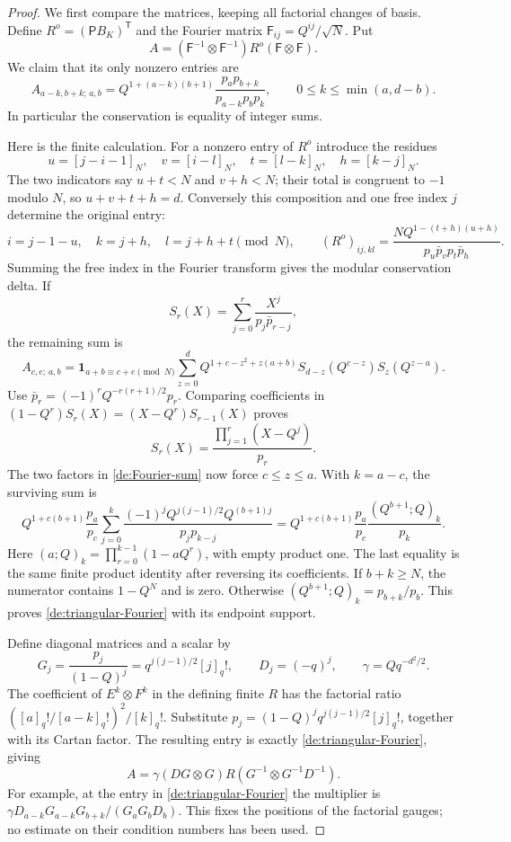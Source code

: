 \begin{proof}
We first compare the matrices, keeping all factorial changes
of basis. Define \(R^o=(\mathsf P B_K)^{\mathsf T}\) and the
Fourier matrix \(\mathsf F_{ij}=Q^{ij}/\sqrt N\). Put
\[
 A=(\mathsf F^{-1}\otimes\mathsf F^{-1})R^o
                         (\mathsf F\otimes\mathsf F).
\]
We claim that its only nonzero entries are
\begin{equation}\label{de:triangular-Fourier}
 A_{a-k,b+k;\,a,b}
   =Q^{1+(a-k)(b+1)}
      \frac{p_a p_{b+k}}{p_{a-k}p_b p_k},
 \qquad 0\le k\le\min(a,d-b).
\end{equation}
In particular the conservation is equality of integer sums.

Here is the finite calculation. For a nonzero entry of \(R^o\)
introduce the residues
\[
 u=[j-i-1]_N,\quad v=[i-l]_N,\quad
 t=[l-k]_N,\quad h=[k-j]_N.
\]
The two indicators say \(u+t<N\) and \(v+h<N\); their total
is congruent to \(-1\) modulo \(N\), so
\(u+v+t+h=d\). Conversely this composition and one free index
\(j\) determine the original entry:
\[
 i=j-1-u,\quad k=j+h,\quad l=j+h+t\pmod N,\qquad
 (R^o)_{ij,kl}
 =\frac{NQ^{1-(t+h)(u+h)}}{p_u\bar p_vp_t\bar p_h}.
\]
Summing the free index in the Fourier transform gives the
modular conservation delta. If
\[
 S_r(X)=\sum_{j=0}^r\frac{X^j}{p_j\bar p_{r-j}},
\]
the remaining sum is
\begin{equation}\label{de:Fourier-sum}
 A_{c,e;\,a,b}
 =\mathbf1_{a+b\equiv c+e\pmod N}
 \sum_{z=0}^d Q^{1+c-z^2+z(a+b)}
             S_{d-z}(Q^{c-z})S_z(Q^{z-a}).
\end{equation}
Use
\(\bar p_r=(-1)^rQ^{-r(r+1)/2}p_r\).
Comparing coefficients in
\((1-Q^r)S_r(X)=(X-Q^r)S_{r-1}(X)\) proves
\[
                    S_r(X)=\frac{\prod_{j=1}^r(X-Q^j)}{p_r}.
\]
The two factors in \eqref{de:Fourier-sum} now force
\(c\le z\le a\). With \(k=a-c\), the surviving sum is
\[
 Q^{1+c(b+1)}\frac{p_a}{p_c}
 \sum_{j=0}^k
   \frac{(-1)^jQ^{j(j-1)/2}Q^{(b+1)j}}{p_jp_{k-j}}
 =
 Q^{1+c(b+1)}\frac{p_a}{p_c}
                    \frac{(Q^{b+1};Q)_k}{p_k}.
\]
Here \((a;Q)_k=\prod_{r=0}^{k-1}(1-aQ^r)\), with empty
product one. The last equality is the same finite product identity after
reversing its coefficients. If \(b+k\ge N\), the numerator
contains \(1-Q^N\) and is zero. Otherwise
\((Q^{b+1};Q)_k=p_{b+k}/p_b\). This proves
\eqref{de:triangular-Fourier} with its endpoint support.

Define diagonal matrices and a scalar by
\[
 G_j=\frac{p_j}{(1-Q)^j}=q^{j(j-1)/2}[j]_q!,
 \qquad D_j=(-q)^j,\qquad \gamma=Qq^{-d^2/2}.
\]
The coefficient of \(E^k\otimes F^k\) in the defining finite
\(R\) has the factorial ratio
\(([a]_q!/[a-k]_q!)^2/[k]_q!\).
Substitute \(p_j=(1-Q)^jq^{j(j-1)/2}[j]_q!\), together with its
Cartan factor. The resulting entry is exactly
\eqref{de:triangular-Fourier}, giving
\begin{equation}\label{de:factorial-similarity}
 A=\gamma(DG\otimes G)R
                 (G^{-1}\otimes G^{-1}D^{-1}).
\end{equation}
For example, at the entry in
\eqref{de:triangular-Fourier} the multiplier is
\(\gamma D_{a-k}G_{a-k}G_{b+k}/(G_aG_bD_b)\).
This fixes the positions of the factorial gauges; no estimate
on their condition numbers has been used.


\end{proof}
